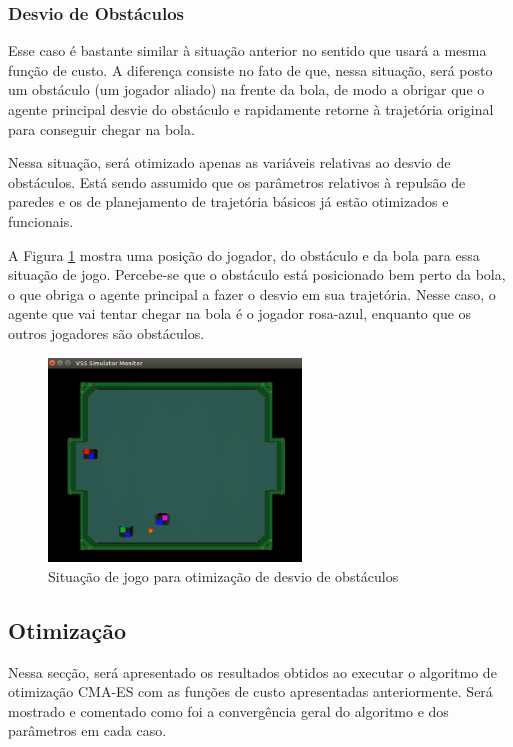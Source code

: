 \documentclass[a4paper,12pt]{article}
\begin{document}
\subsubsection{Desvio de Obstáculos}

Esse caso é bastante similar à situação anterior no sentido que usará a mesma função de custo. A diferença consiste no fato de que, nessa situação, será posto um obstáculo (um jogador aliado) na frente da bola, de modo a obrigar que o agente principal desvie do obstáculo e rapidamente retorne à trajetória original para conseguir chegar na bola.

Nessa situação, será otimizado apenas as variáveis relativas ao desvio de obstáculos. Está sendo assumido que os parâmetros relativos à repulsão de paredes e os de planejamento de trajetória básicos já estão otimizados e funcionais.

A Figura \ref{fig:com_obstaculo_simulacao} mostra uma posição do jogador, do obstáculo e da bola para essa situação de jogo. Percebe-se que o obstáculo está posicionado bem perto da bola, o que obriga o agente principal a fazer o desvio em sua trajetória. Nesse caso, o agente que vai tentar chegar na bola é o jogador rosa-azul, enquanto que os outros jogadores são obstáculos.

\begin{figure}[H]
	\centering
	\includegraphics[width=0.6\textwidth]{figures/OtimizacaoComObstaculoSimulacao.png}
	\caption{Situação de jogo para otimização de desvio de obstáculos}
	\label{fig:com_obstaculo_simulacao}
\end{figure}


\subsection{Otimização}

Nessa secção, será apresentado os resultados obtidos ao executar o algoritmo de otimização CMA-ES com as funções de custo apresentadas anteriormente. Será mostrado e comentado como foi a convergência geral do algoritmo e dos parâmetros em cada caso.
\end{document}
